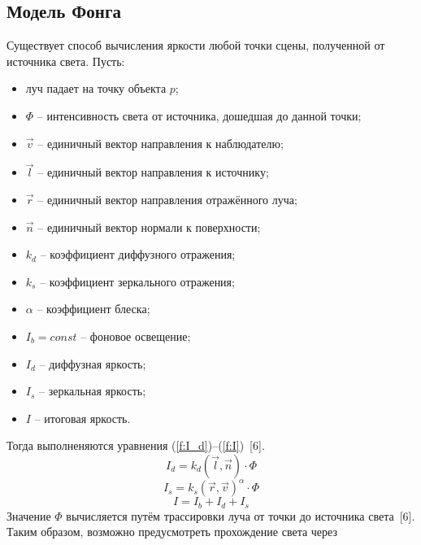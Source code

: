 {    \subsection {Модель Фонга} {
        Существует способ вычисления яркости любой точки сцены,
        полученной от источника света.
        Пусть:
        \begin{itemize}
            \item луч падает на точку объекта $p$;
            \item
                $\Phi$ -- интенсивность света от источника,
                дошедшая до данной точки;
            \item $\vec{v}$ -- единичный вектор направления к наблюдателю;
            \item $\vec{l}$ -- единичный вектор направления к источнику;
            \item $\vec{r}$ -- единичный вектор направления отражённого луча;
            \item $\vec{n}$ -- единичный вектор нормали к поверхности;
            \item $k_d$ -- коэффициент диффузного отражения;
            \item $k_s$ -- коэффициент зеркального отражения;
            \item $\alpha$ -- коэффициент блеска;
            \item $I_b = const$ -- фоновое освещение;
            \item $I_d$ -- диффузная яркость;
            \item $I_s$ -- зеркальная яркость;
            \item $I$ -- итоговая яркость.
        \end{itemize}
        Тогда выполненяются уравнения (\ref{f:I_d})--(\ref{f:I})~[6].
        \begin{equation}
            \label{f:I_d}
            I_d = k_d(\vec{l}, \vec{n}) \cdot \Phi
        \end{equation}
        \begin{equation}
            \label{f:I_s}
            I_s = k_s(\vec{r}, \vec{v})^{\alpha} \cdot \Phi
        \end{equation}
        \begin{equation}
            \label{f:I}
            I = I_b + I_d + I_s
        \end{equation}
        Значение $\Phi$ вычисляется путём трассировки луча
        от точки до источника света~[6].
        Таким образом, возможно предусмотреть прохождение света через
}}
